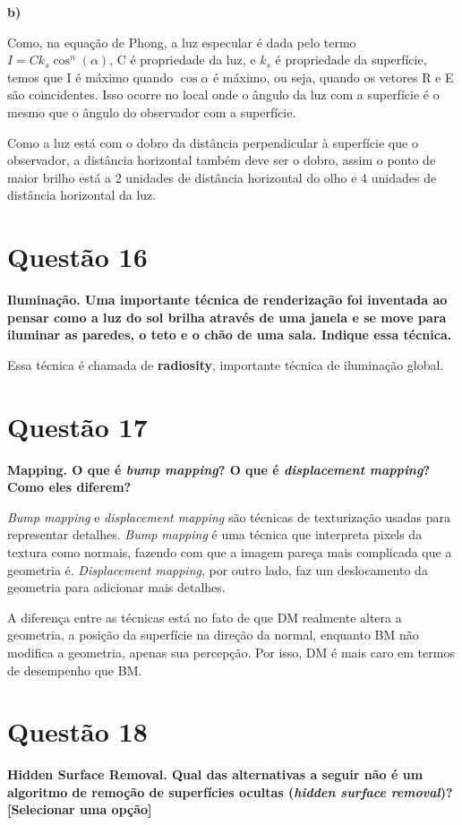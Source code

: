 \documentclass[12pt]{exam}
\begin{document}
\textbf{b)}

Como, na equação de Phong, a luz especular é dada pelo termo $I = Ck_s \cos^n(\alpha)$, C é propriedade da luz, e $k_s$ é propriedade da superfície, temos que I é máximo quando $\cos{\alpha}$ é máximo, ou seja, quando os vetores R e E são coincidentes. Isso ocorre no local onde o ângulo da luz com a superfície é o mesmo que o ângulo do observador com a superfície.

Como a luz está com o dobro da distância perpendicular à superfície que o observador, a distância horizontal também deve ser o dobro, assim o ponto de maior brilho está a 2 unidades de distância horizontal do olho e 4 unidades de distância horizontal da luz.

\section*{Questão 16}
{\bfseries Iluminação. Uma importante técnica de renderização foi inventada ao pensar como a luz do sol brilha através de uma janela e se move para iluminar as paredes, o teto e o chão de uma sala. Indique essa técnica.}

Essa técnica é chamada de \textbf{radiosity}, importante técnica de iluminação global.

\section*{Questão 17}
{\bfseries Mapping. O que é \textit{bump mapping}? O que é \textit{displacement mapping}? Como eles diferem?}

\textit{Bump mapping} e \textit{displacement mapping} são técnicas de texturização usadas para representar detalhes. \textit{Bump mapping} é uma técnica que interpreta pixels da textura como normais, fazendo com que a imagem pareça mais complicada que a geometria é. \textit{Displacement mapping}, por outro lado, faz um deslocamento da geometria para adicionar mais detalhes.

A diferença entre as técnicas está no fato de que DM realmente altera a geometria, a posição da superfície na direção da normal, enquanto BM não modifica a geometria, apenas sua percepção. Por isso, DM é mais caro em termos de desempenho que BM.

\section*{Questão 18}
{\bfseries Hidden Surface Removal. Qual das alternativas a seguir não é um algoritmo de remoção de superfícies ocultas (\textit{hidden surface removal})? [Selecionar uma opção]}
\end{document}

